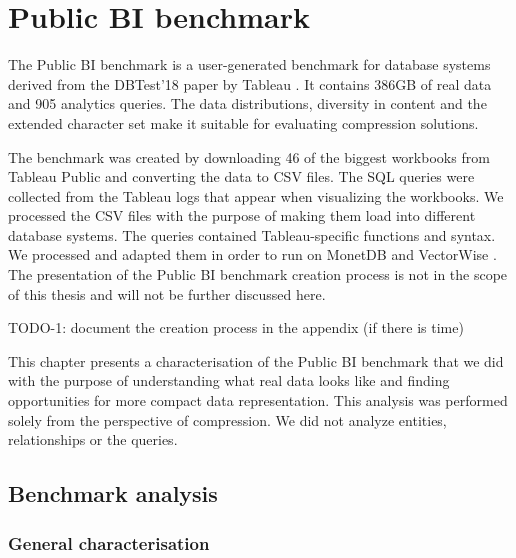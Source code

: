 
\chapter{Public BI benchmark} %
\label{ch:pbib}


\graphicspath{{3_pbib/images/}}

% 

The Public BI benchmark \cite{pbib} is a user-generated benchmark for database systems derived from the DBTest'18 paper by Tableau \cite{vogelsgesang2018get}. It contains 386GB of real data and 905 analytics queries. The data distributions, diversity in content and the extended character set make it suitable for evaluating compression solutions.

The benchmark was created by downloading 46 of the biggest workbooks from Tableau Public \cite{tableaupublic} and converting the data to CSV files. The SQL queries were collected from the Tableau logs that appear when visualizing the workbooks. We processed the CSV files with the purpose of making them load into different database systems. The queries contained Tableau-specific functions and syntax. We processed and adapted them in order to run on MonetDB \cite{boncz2005monetdb} and VectorWise \cite{zukowski2012vectorwise}. The presentation of the Public BI benchmark creation process is not in the scope of this thesis and will not be further discussed here.

TODO-1: document the creation process in the appendix (if there is time)

This chapter presents a characterisation of the Public BI benchmark that we did with the purpose of understanding what real data looks like and finding opportunities for more compact data representation. This analysis was performed solely from the perspective of compression. We did not analyze entities, relationships or the queries.

\section{Benchmark analysis}
\label{sec:pbib:characterisation}

\subsection{General characterisation}

